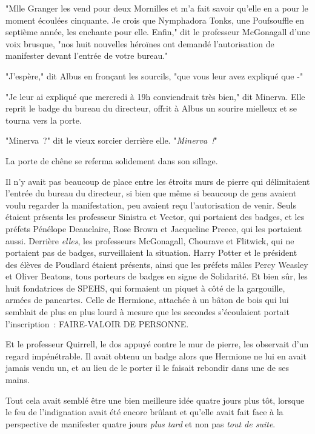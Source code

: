 "Mlle Granger les vend pour deux Mornilles et m'a fait savoir qu'elle en a pour le moment écoulées cinquante. Je crois que Nymphadora Tonks, une Poufsouffle en septième année, les enchante pour elle. Enfin," dit le professeur McGonagall d'une voix brusque, "nos huit nouvelles héroïnes ont demandé l'autorisation de manifester devant l'entrée de votre bureau."

"J'espère," dit Albus en fronçant les sourcils, "que vous leur avez expliqué que -"

"Je leur ai expliqué que mercredi à 19h conviendrait très bien," dit Minerva. Elle reprit le badge du bureau du directeur, offrit à Albus un sourire mielleux et se tourna vers la porte.

"Minerva~?" dit le vieux sorcier derrière elle. "\emph{Minerva~!}"

La porte de chêne se referma solidement dans son sillage.

\later

Il n'y avait pas beaucoup de place entre les étroits murs de pierre qui délimitaient l'entrée du bureau du directeur, si bien que même si beaucoup de gens avaient voulu regarder la manifestation, peu avaient reçu l'autorisation de venir. Seuls étaient présents les professeur Sinistra et Vector, qui portaient des badges, et les préfets Pénélope Deauclaire, Rose Brown et Jacqueline Preece, qui les portaient aussi. Derrière \emph{elles}, les professeurs McGonagall, Chourave et Flitwick, qui ne portaient pas de badges, surveillaient la situation. Harry Potter et le président des élèves de Poudlard étaient présents, ainsi que les préfets mâles Percy Weasley et Oliver Beatons, tous porteurs de badges en signe de Solidarité. Et bien sûr, les huit fondatrices de SPEHS, qui formaient un piquet à côté de la gargouille, armées de pancartes. Celle de Hermione, attachée à un bâton de bois qui lui semblait de plus en plus lourd à mesure que les secondes s'écoulaient portait l'inscription~: FAIRE-VALOIR DE PERSONNE.

Et le professeur Quirrell, le dos appuyé contre le mur de pierre, les observait d'un regard impénétrable. Il avait obtenu un badge alors que Hermione ne lui en avait jamais vendu un, et au lieu de le porter il le faisait rebondir dans une de ses mains.

Tout cela avait semblé être une bien meilleure idée quatre jours plus tôt, lorsque le feu de l'indignation avait été encore brûlant et qu'elle avait fait face à la perspective de manifester quatre jours \emph{plus tard} et non pas \emph{tout de suite}.

